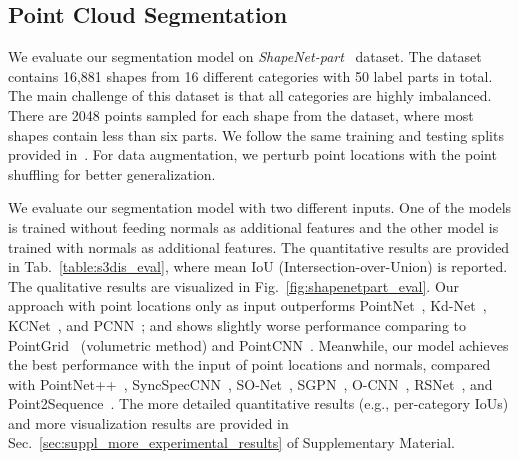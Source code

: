 \documentclass[10pt,twocolumn,letterpaper]{article}
\begin{document}
\subsection{Point Cloud Segmentation}\vspace{-1mm}


We evaluate our segmentation model on \textit{ShapeNet-part}~\cite{yi2016scalable} dataset. The dataset contains 16,881 shapes from 16 different categories with 50 label parts in total. The main challenge of this dataset is that all categories are highly imbalanced. There are 2048 points sampled for each shape from the dataset, where most shapes contain less than six parts. We follow the same training and testing splits provided in~\cite{qi2017pointnet,yi2016scalable}. For data augmentation, we perturb point locations with the point shuffling for better generalization.

We evaluate our segmentation model with two different inputs. One of the models is trained without feeding normals as additional features and the other model is trained with normals as additional features. The quantitative results are provided in Tab.~\ref{table:s3dis_eval}, where mean IoU (Intersection-over-Union) is reported. The qualitative results are visualized in Fig.~\ref{fig:shapenetpart_eval}.
Our approach with point locations only as input outperforms PointNet~\cite{qi2017pointnet}, Kd-Net~\cite{klokov2017escape}, KCNet~\cite{shen2018mining}, and PCNN~\cite{atzmon2018point}; and shows slightly worse performance comparing to PointGrid~\cite{le2018pointgrid} (volumetric method) and PointCNN~\cite{li2018pointcnn}.
Meanwhile, our model achieves the best performance with the input of point locations and normals, compared with PointNet++~\cite{qi2017pointnet++}, SyncSpecCNN~\cite{yi2017syncspeccnn}, SO-Net~\cite{li2018so}, SGPN~\cite{wang2018sgpn}, O-CNN~\cite{wang2017cnn}, RSNet~\cite{huang2018recurrent}, and Point2Sequence~\cite{liu2018point2sequence}. The more detailed quantitative results (e.g., per-category IoUs) and more visualization results are provided in Sec.~\ref{sec:suppl_more_experimental_results} of Supplementary Material.
\end{document}
